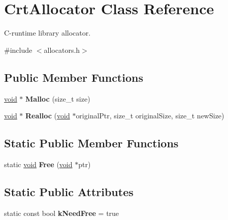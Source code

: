 \hypertarget{class_crt_allocator}{}\section{Crt\+Allocator Class Reference}
\label{class_crt_allocator}


C-\/runtime library allocator.  




{\ttfamily \#include $<$allocators.\+h$>$}

\subsection*{Public Member Functions}
\begin{DoxyCompactItemize}
\item 
\hypertarget{class_crt_allocator_acd720631f8c094041afa6c7951f0d935}{}\hyperlink{_s_d_l__audio_8h_a52835ae37c4bb905b903cbaf5d04b05f}{void} $\ast$ {\bfseries Malloc} (size\+\_\+t size)\label{class_crt_allocator_acd720631f8c094041afa6c7951f0d935}

\item 
\hypertarget{class_crt_allocator_a646bb6f68afe773a62a22f7f14f83e97}{}\hyperlink{_s_d_l__audio_8h_a52835ae37c4bb905b903cbaf5d04b05f}{void} $\ast$ {\bfseries Realloc} (\hyperlink{_s_d_l__audio_8h_a52835ae37c4bb905b903cbaf5d04b05f}{void} $\ast$original\+Ptr, size\+\_\+t original\+Size, size\+\_\+t new\+Size)\label{class_crt_allocator_a646bb6f68afe773a62a22f7f14f83e97}

\end{DoxyCompactItemize}
\subsection*{Static Public Member Functions}
\begin{DoxyCompactItemize}
\item 
\hypertarget{class_crt_allocator_a5043907058d906dcb1291e9491560373}{}static \hyperlink{_s_d_l__audio_8h_a52835ae37c4bb905b903cbaf5d04b05f}{void} {\bfseries Free} (\hyperlink{_s_d_l__audio_8h_a52835ae37c4bb905b903cbaf5d04b05f}{void} $\ast$ptr)\label{class_crt_allocator_a5043907058d906dcb1291e9491560373}

\end{DoxyCompactItemize}
\subsection*{Static Public Attributes}
\begin{DoxyCompactItemize}
\item 
\hypertarget{class_crt_allocator_ac7df8398c529290f0cd5950d9492f524}{}static const bool {\bfseries k\+Need\+Free} = true\label{class_crt_allocator_ac7df8398c529290f0cd5950d9492f524}

\end{DoxyCompactItemize}


